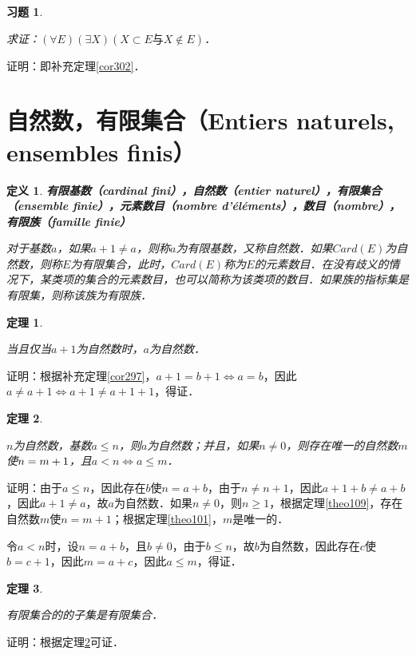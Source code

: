 \documentclass[12pt, a4paper, oneside]{book}
\newtheorem{theo}{定理}
\newtheorem{de}{定义}
\newtheorem{exer}{习题}
\begin{document}
			\begin{exer}\label{exer126}
				\hfill\par
				求证：$(\forall E)(\exists X)(X\subset E\text{与}X \notin E)$．
			\end{exer}
			证明：即补充定理\ref{cor302}．

		\section{自然数，有限集合（Entiers naturels, ensembles finis）}		
			\begin{de}
				\textbf{有限基数（cardinal fini），自然数（entier naturel），有限集合（ensemble finie），元素数目（nombre d'éléments），数目（nombre），有限族（famille finie）
				}
				\par
				对于基数$a$，如果$a+1\neq a$，则称$a$为有限基数，又称自然数．如果$Card(E)$为自然数，则称$E$为有限集合，此时，$Card(E)$称为$E$的元素数目．在没有歧义的情况下，某类项的集合的元素数目，也可以简称为该类项的数目．如果族的指标集是有限集，则称该族为有限族．
			\end{de}
			
			\begin{theo}\label{theo115}
				\hfill\par
				当且仅当$a+1$为自然数时，$a$为自然数．
			\end{theo}
			证明：根据补充定理\ref{cor297}，$a+1=b+1\Leftrightarrow a=b$，因此$a\neq a+1\Leftrightarrow a+1\neq a+1+1$，得证．
						
			\begin{theo}\label{theo116}
				\hfill\par
				$n$为自然数，基数$a\leq n$，则$a$为自然数；并且，如果$n\neq 0$，则存在唯一的自然数$m$使$n\\=m+1$，且$a<n\Leftrightarrow a\leq m$．
			\end{theo}
			证明：由于$a\leq n$，因此存在$b$使$n=a+b$，由于$n\neq n+1$，因此$a+1+b\neq a+b$，因此$a+1\neq a$，故$a$为自然数．如果$n\neq 0$，则$n\geq 1$，根据定理\ref{theo109}，存在自然数$m$使$n=m+1$；根据定理\ref{theo101}，$m$是唯一的．
			\par
			令$a<n$时，设$n=a+b$，且$b\neq 0$，由于$b\leq n$，故$b$为自然数，因此存在$c$使$b=c+1$，因此$m=a+c$，因此$a\leq m$，得证．
						
			\begin{theo}\label{theo117}
				\hfill\par
				有限集合的的子集是有限集合．
			\end{theo}
			证明：根据定理\ref{theo116}可证．
									
\end{document}
